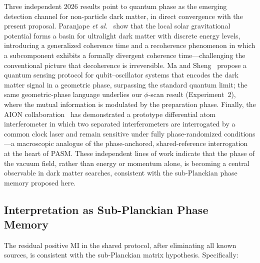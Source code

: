 ﻿\documentclass[12pt,a4paper]{article}
\begin{document}
Three independent 2026 results point to quantum phase as the emerging detection channel for non-particle dark matter, in direct convergence with the present proposal. Paranjape \textit{et al.}~\cite{recoherence2026} show that the local solar gravitational potential forms a basin for ultralight dark matter with discrete energy levels, introducing a generalized coherence time and a recoherence phenomenon in which a subcomponent exhibits a formally divergent coherence time---challenging the conventional picture that decoherence is irreversible. Ma and Sheng~\cite{ma2026geometric} propose a quantum sensing protocol for qubit--oscillator systems that encodes the dark matter signal in a geometric phase, surpassing the standard quantum limit; the same geometric-phase language underlies our $\phi$-scan result (Experiment~2), where the mutual information is modulated by the preparation phase. Finally, the AION collaboration~\cite{aion2026nature} has demonstrated a prototype differential atom interferometer in which two separated interferometers are interrogated by a common clock laser and remain sensitive under fully phase-randomized conditions---a macroscopic analogue of the phase-anchored, shared-reference interrogation at the heart of PASM. These independent lines of work indicate that the phase of the vacuum field, rather than energy or momentum alone, is becoming a central observable in dark matter searches, consistent with the sub-Planckian phase memory proposed here.

\subsection{Interpretation as Sub-Planckian Phase Memory}

The residual positive MI in the shared protocol, after eliminating all known sources, is consistent with the sub-Planckian matrix hypothesis. Specifically:
\end{document}
